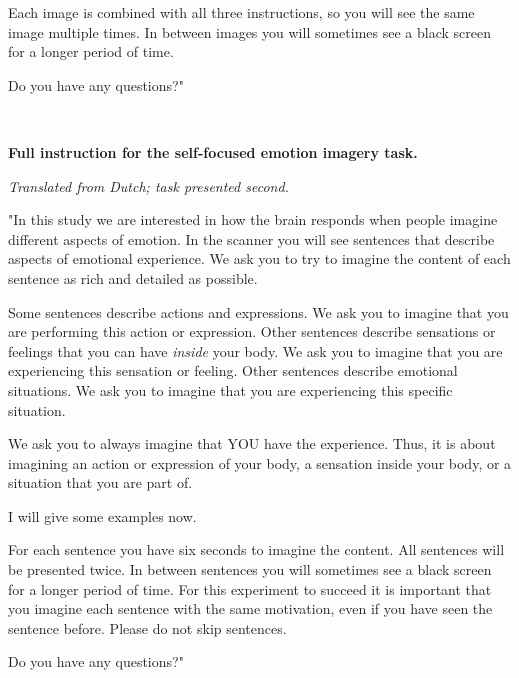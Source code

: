\documentclass[11pt,american,a4paper,oneside,]{memoir} %
\begin{document}
Each image is combined with all three instructions, so you will see the same image multiple times. In between images you will sometimes see a black screen for a longer period of time.

Do you have any questions?"

~
~

\textbf{Full instruction for the self-focused emotion imagery task.}

\emph{Translated from Dutch; task presented second.}

"In this study we are interested in how the brain responds when people imagine different aspects of emotion. In the scanner you will see sentences that describe aspects of emotional experience. We ask you to try to imagine the content of each sentence as rich and detailed as possible.

Some sentences describe actions and expressions. We ask you to imagine that you are performing this action or expression. Other sentences describe sensations or feelings that you can have \emph{inside} your body. We ask you to imagine that you are experiencing this sensation or feeling. Other sentences describe emotional situations. We ask you to imagine that you are experiencing this specific situation.

We ask you to always imagine that YOU have the experience. Thus, it is about imagining an action or expression of your body, a sensation inside your body, or a situation that you are part of.

I will give some examples now.

For each sentence you have six seconds to imagine the content. All sentences will be presented twice. In between sentences you will sometimes see a black screen for a longer period of time. For this experiment to succeed it is important that you imagine each sentence with the same motivation, even if you have seen the sentence before. Please do not skip sentences.

Do you have any questions?"
\end{document}
